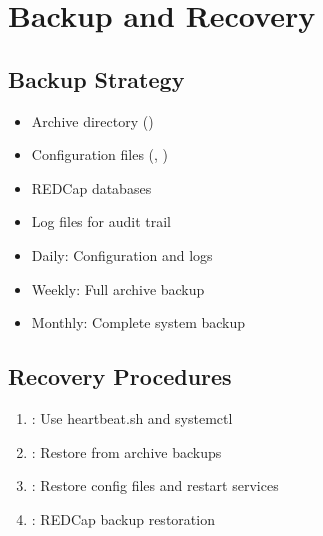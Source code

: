 \documentclass[letterpaper,10pt,english]{sphinxmanual}
\begin{document}
\section{Backup and Recovery}
\label{\detokenize{Temp/admin-options:backup-and-recovery}}

\subsection{Backup Strategy}
\label{\detokenize{Temp/admin-options:backup-strategy}}\begin{description}
\begin{itemize}
\item {} 
\sphinxAtStartPar
Archive directory ()

\item {} 
\sphinxAtStartPar
Configuration files (, )

\item {} 
\sphinxAtStartPar
REDCap databases

\item {} 
\sphinxAtStartPar
Log files for audit trail

\end{itemize}

\begin{itemize}
\item {} 
\sphinxAtStartPar
Daily: Configuration and logs

\item {} 
\sphinxAtStartPar
Weekly: Full archive backup

\item {} 
\sphinxAtStartPar
Monthly: Complete system backup

\end{itemize}

\end{description}


\subsection{Recovery Procedures}
\label{\detokenize{Temp/admin-options:recovery-procedures}}\begin{enumerate}
%
\item {} 
\sphinxAtStartPar
{}: Use heartbeat.sh and systemctl

\item {} 
\sphinxAtStartPar
{}: Restore from archive backups

\item {} 
\sphinxAtStartPar
{}: Restore config files and restart services

\item {} 
\sphinxAtStartPar
{}: REDCap backup restoration

\end{enumerate}
\end{document}
